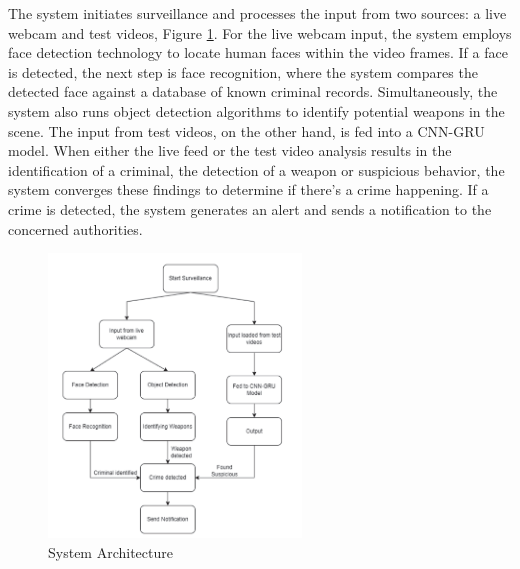 The \citet{rfc7} system initiates surveillance and processes the input from two sources: a live webcam and test videos, Figure \ref{fig:shenoy-architecture}. For the live webcam input, the system employs face detection technology to locate human faces within the video frames. If a face is detected, the next step is face recognition, where the system compares the detected face against a database of known criminal records. Simultaneously, the system also runs object detection algorithms to identify potential weapons in the scene. The input from test videos, on the other hand, is fed into a CNN-GRU model. When either the live feed or the test video analysis results in the identification of a criminal, the detection of a weapon or suspicious behavior, the system converges these findings to determine if there's a crime happening. If a crime is detected, the system generates an alert and sends a notification to the concerned authorities.

\begin{figure}[h]
    \centering 
    \includegraphics[width=0.6\textwidth]{figs/shenoy-architecture.png} 
    \caption{\citet{rfc7} System Architecture}
    \label{fig:shenoy-architecture}
\end{figure}